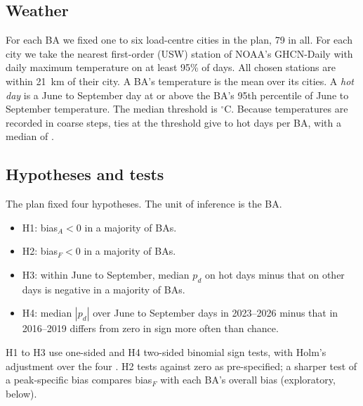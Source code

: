 \documentclass[conference,a4paper]{IEEEtran}
\begin{document}
\subsection{Weather}
For each BA we fixed one to six load-centre cities in the plan, 79 in all. For each city we take the nearest first-order (USW) station of NOAA's GHCN-Daily \cite{menne2012ghcn} with daily maximum temperature on at least 95\% of days. All chosen stations are within 21~km of their city. A BA's temperature is the mean over its cities. A \emph{hot day} is a June to September day at or above the BA's 95th percentile of June to September temperature. The median threshold is $^\circ$C. Because temperatures are recorded in coarse steps, ties at the threshold give  to  hot days per BA, with a median of .

\subsection{Hypotheses and tests}
The plan fixed four hypotheses. The unit of inference is the BA.
\begin{itemize}
\item H1: bias$_A<0$ in a majority of BAs.
\item H2: bias$_F<0$ in a majority of BAs.
\item H3: within June to September, median $p_d$ on hot days minus that on other days is negative in a majority of BAs.
\item H4: median $|p_d|$ over June to September days in 2023--2026 minus that in 2016--2019 differs from zero in sign more often than chance.
\end{itemize}
H1 to H3 use one-sided and H4 two-sided binomial sign tests, with Holm's adjustment over the four \cite{holm1979simple}. H2 tests against zero as pre-specified; a sharper test of a peak-specific bias compares bias$_F$ with each BA's overall bias (exploratory, below).
\end{document}
